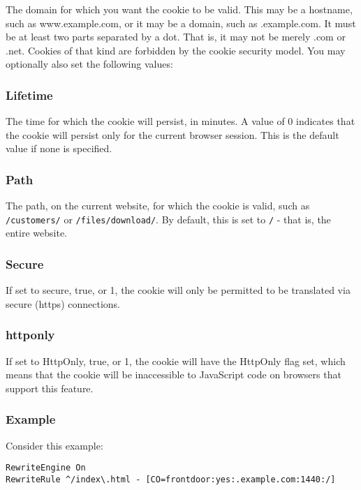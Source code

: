 The domain for which you want the cookie to be valid. This may be a hostname, such as www.example.com, or it may be a domain, such as .example.com. It must be at least two parts separated by a dot. That is, it may not be merely .com or .net. Cookies of that kind are forbidden by the cookie security model.
You may optionally also set the following values:

\subsubsection{Lifetime}

The time for which the cookie will persist, in minutes.
A value of 0 indicates that the cookie will persist only for the current browser session. This is the default value if none is specified.

\subsubsection{Path}

The path, on the current website, for which the cookie is valid, such as \verb~/customers/~ or \verb~/files/download/~.
By default, this is set to \verb~/~ - that is, the entire website.

\subsubsection{Secure}

If set to secure, true, or 1, the cookie will only be permitted to be translated via secure (https) connections.

\subsubsection{httponly}

If set to HttpOnly, true, or 1, the cookie will have the HttpOnly flag set, which means that the cookie will be inaccessible to JavaScript code on browsers that support this feature.

\subsubsection{Example}

Consider this example:

\begin{verbatim}
RewriteEngine On
RewriteRule ^/index\.html - [CO=frontdoor:yes:.example.com:1440:/]
\end{verbatim}

